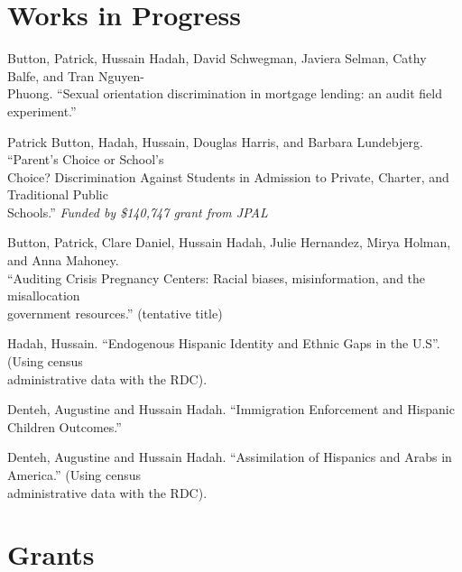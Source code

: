\documentclass[letterpaper]{article}
\renewenvironment{itemize}{
  \begin{list}{}{
    \setlength{\leftmargin}{1.5em}
  }
}{
  \end{list}
}
\begin{document}
\section*{Works in Progress}
\vspace{2 mm}
\begin{itemize}
\item Button, Patrick, Hussain Hadah, David Schwegman, Javiera Selman, Cathy Balfe\student, and Tran Nguyen-\\{\makebox[4mm]{\hfill}}Phuong\student. ``Sexual orientation discrimination in mortgage lending: an audit field experiment.''

\item Patrick Button, Hadah, Hussain, Douglas Harris, and Barbara Lundebjerg\student. ``Parent’s Choice or School’s \\{\makebox[4mm]{\hfill}} Choice?
Discrimination Against Students in Admission to Private, Charter, and Traditional Public \\{\makebox[4mm]{\hfill}} Schools.'' \textit{Funded by \$140,747 grant from JPAL}

\item Button, Patrick, Clare Daniel, Hussain Hadah, 
Julie Hernandez, Mirya Holman, and Anna Mahoney. 
\\{\makebox[4mm]{\hfill}}``Auditing Crisis
 Pregnancy Centers: Racial biases, misinformation, 
and the misallocation \\{\makebox[4mm]{\hfill}}government resources.'' (tentative title)

\item Hadah, Hussain. ``Endogenous Hispanic Identity and Ethnic Gaps in the U.S''. (Using census \\{\makebox[4mm]{\hfill}} administrative data with the RDC).
\item Denteh, Augustine and Hussain Hadah. ``Immigration Enforcement and Hispanic Children Outcomes.''
\item Denteh, Augustine and Hussain Hadah. ``Assimilation of Hispanics and Arabs in America.'' (Using census \\{\makebox[4mm]{\hfill}} administrative data with the RDC).


\end{itemize}


\section*{Grants}
\end{document}
